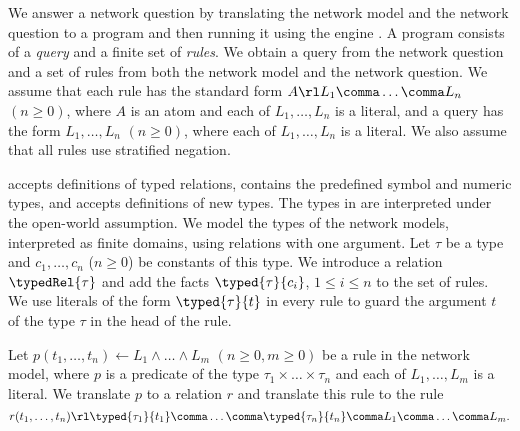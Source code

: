 We answer a network question by translating the network model and the network question to a \Datalog program and then running it using the \Datalog engine \souffle\cite{souffle}. A \Datalog program consists of a \Datalog \emph{query} and a finite set of \Datalog \textit{rules}. We obtain a query from the network question and a set of rules from both the network model and the network question. We assume that each \Datalog rule has the standard form $A\rl L_1\comma\ldots\comma L_n$ $(n\ge0)$, where $A$ is an atom and each of $L_1,\ldots,L_n$ is a literal, and a \Datalog query has the form $L_1\comma\ldots\comma L_n$ $(n\ge0)$, where each of $L_1,\ldots,L_n$ is a literal. We also assume that all \Datalog rules use stratified negation.


\souffle accepts definitions of typed relations, contains the predefined symbol and numeric types, and accepts definitions of new types. The types in \souffle are interpreted under the open-world assumption. We model the types of the network models, interpreted as finite domains, using \Datalog relations with one argument. Let $\tau$ be a type and $c_1,\ldots,c_n$ ($n\ge0$) be constants of this type. We introduce a relation $\typedRel{\tau}$ and add the facts $\typed{\tau}{c_i}$, $1\le i\le n$ to the set of \Datalog rules. We use literals of the form $\typed{\tau}{t}$ in every \Datalog rule to guard the argument $t$ of the type $\tau$ in the head of the rule. %

Let $p(t_1,\ldots,t_n)\leftarrow L_1\wedge\ldots\wedge L_m$ $(n\ge0,m\ge0)$ be a rule in the network model, where $p$ is a predicate of the type $\tau_1\times\ldots\times\tau_n$ and each of $L_1,\ldots,L_m$ is a literal. We translate $p$ to a \Datalog relation $r$ and translate this rule to the \Datalog rule $$r(t_1,\ldots,t_n)\rl\typed{\tau_1}{t_1}\comma\ldots\comma\typed{\tau_n}{t_n}\comma L_1\comma\ldots\comma L_m.$$

